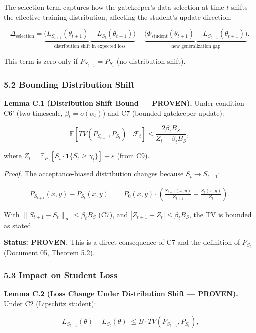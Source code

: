 \documentclass[
  12pt,
]{ctexart}
\begin{document}
The selection term captures how the gatekeeper's data selection at time
\(t\) shifts the effective training distribution, affecting the
student's update direction:

\[\Delta_{\text{selection}} = \underbrace{\bigl(L_{S_{t+1}}(\theta_{t+1}) - L_{S_t}(\theta_{t+1})\bigr)}_{\text{distribution shift in expected loss}} + \underbrace{\bigl(\Phi_{\text{student}}(\theta_{t+1}) - L_{S_{t+1}}(\theta_{t+1})\bigr)}_{\text{new generalization gap}}.\]

This term is zero only if \(P_{S_{t+1}} = P_{S_t}\) (no distribution
shift).

\subsubsection{5.2 Bounding Distribution
Shift}\label{bounding-distribution-shift}

\textbf{Lemma C.1 (Distribution Shift Bound --- PROVEN).} Under
condition C6' (two-timescale, \(\beta_t = o(\alpha_t)\)) and C7 (bounded
gatekeeper update):

\[\mathbb{E}[TV(P_{S_{t+1}}, P_{S_t}) \mid \mathcal{F}_t] \leq \frac{2\beta_t B_S}{Z_t - \beta_t B_S},\]

where
\(Z_t = \mathbb{E}_{P_0}[S_t \cdot \mathbf{1}\{S_t \geq \gamma_t\}] + \varepsilon\)
(from C9).

\emph{Proof.} The acceptance-biased distribution changes because
\(S_t \to S_{t+1}\):

\[\begin{aligned}
P_{S_{t+1}}(x,y) - P_{S_t}(x,y) &= P_0(x,y) \cdot \left(\frac{S_{t+1}(x,y)}{Z_{t+1}} - \frac{S_t(x,y)}{Z_t}\right).
\end{aligned}\]

With \(\|S_{t+1} - S_t\|_\infty \leq \beta_t B_S\) (C7), and
\(|Z_{t+1} - Z_t| \leq \beta_t B_S\), the TV is bounded as stated.
\(\square\)

\textbf{Status: PROVEN.} This is a direct consequence of C7 and the
definition of \(P_{S_t}\) (Document 05, Theorem 5.2).

\subsubsection{5.3 Impact on Student Loss}\label{impact-on-student-loss}

\textbf{Lemma C.2 (Loss Change Under Distribution Shift --- PROVEN).}
Under C2 (Lipschitz student):

\[|L_{S_{t+1}}(\theta) - L_{S_t}(\theta)| \leq B \cdot TV(P_{S_{t+1}}, P_{S_t}),\]
\end{document}
